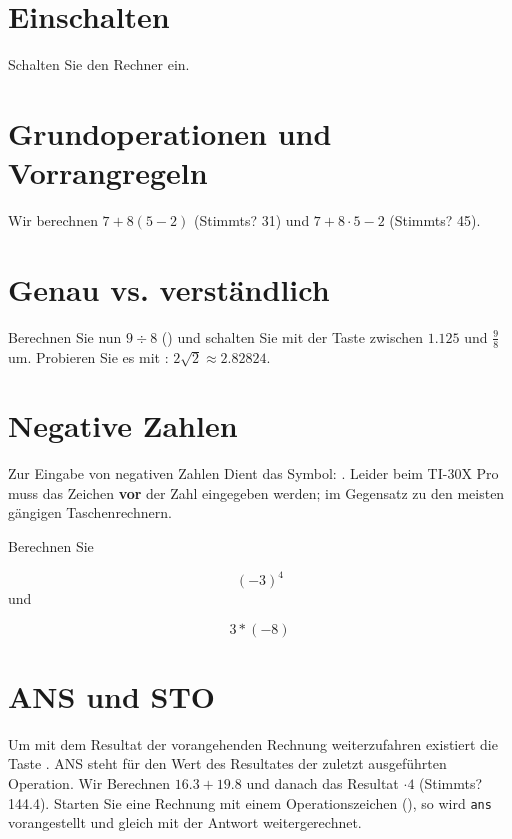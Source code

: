 

\renewcommand{\metaHeaderLine}{Arbeitsblatt}
\renewcommand{\arbeitsblattTitel}{Taschenrechner TI-30 Pro MathPrint
--- Einführung}

\arbeitsblattHeader{}

\section{Einschalten}
Schalten Sie den Rechner ein. 


\section{Grundoperationen und Vorrangregeln}
Wir berechnen $7 + 8(5-2)$  (Stimmts? 31) und $7 + 8\cdot 5 - 2$ (Stimmts? 45).

\section{Genau vs. verständlich}
Berechnen Sie nun $9 \div 8$ () und schalten Sie mit der
Taste  zwischen $1.125$ und $\frac{9}{8}$ um.
Probieren Sie es mit    :
$2\sqrt{2} \approx 2.82824$. 

\section{Negative Zahlen}
Zur Eingabe von negativen Zahlen Dient das
Symbol: . Leider beim TI-30X Pro muss das
Zeichen \textbf{vor} der Zahl eingegeben werden; im Gegensatz zu den
meisten gängigen Taschenrechnern.

Berechnen Sie

$$(-3)^4$$
und

$$3* (-8)$$

\section{ANS und STO}
Um mit dem Resultat der vorangehenden Rechnung weiterzufahren
existiert die Taste  . ANS steht für den Wert des
Resultates der zuletzt ausgeführten Operation. Wir Berechnen $16.3 +
19.8$ und danach das Resultat $\cdot4$ (Stimmts? 144.4). Starten Sie
eine Rechnung mit einem Operationszeichen (\zB {}), so
wird \texttt{ans} vorangestellt und gleich mit der Antwort weitergerechnet.

